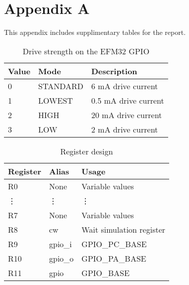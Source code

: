 \section{Appendix A}
\label{appenix:a}

This appendix includes supplimentary tables for the report.

\begin{table}[ht!]
    \begin{center}
    \begin{tabular}{| l | l | l |}
        \hline
        Value   & Mode      & Description \\
        \hline
        0       & STANDARD  & 6 mA drive current \\
        \hline
        1       & LOWEST    & 0.5 mA drive current \\
        \hline
        2       & HIGH      & 20 mA drive current \\
        \hline
        3       & LOW       & 2 mA drive current \\
        \hline
    \end{tabular}
    \caption{Drive strength on the EFM32 GPIO}
    \label{tab:drive_strength}
    \end{center}
\end{table}

\begin{table}[ht!]
    \begin{center}
    \begin{tabular}{ | l | l | l | }
        \hline
        Register    & Alias     & Usage \\
        \hline
        R0          & None      & Variable values\\
        \vdots      & \vdots    & \vdots \\
        R7          & None      & Variable values \\
        \hline
        R8          & cw        & Wait simulation register \\
        \hline
        R9          & gpio\_i   & GPIO\_PC\_BASE \\
        \hline
        R10         & gpio\_o   & GPIO\_PA\_BASE \\
        \hline
        R11         & gpio      & GPIO\_BASE \\
        \hline
    \end{tabular}
    \caption{Register design}
    \label{tab:register_design}
    \end{center}
\end{table}
